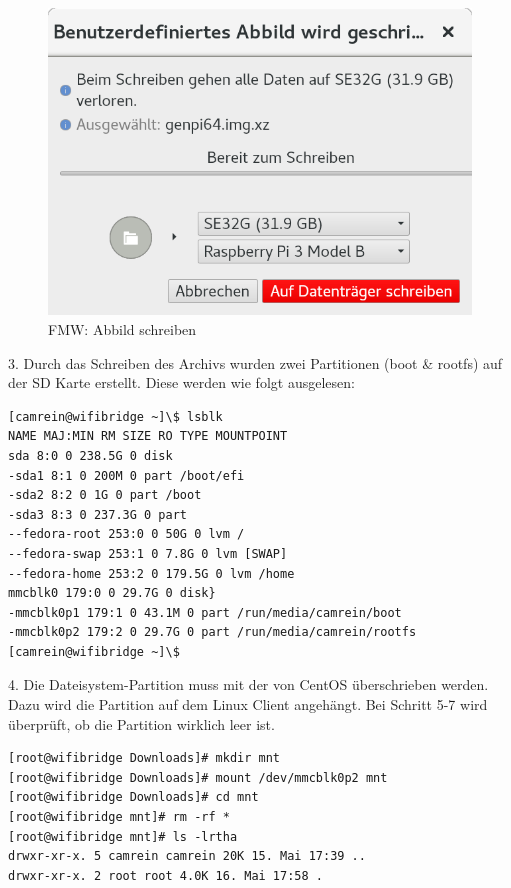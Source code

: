 \begin{figure}[H]
	\centering
	\includegraphics[scale=0.3]{Bilder/fmw3.png}
	\caption{FMW: Abbild schreiben}
\end{figure}
3. Durch das Schreiben des Archivs wurden zwei Partitionen (boot \& rootfs) auf der SD Karte erstellt. Diese werden wie folgt ausgelesen:
\begin{lstlisting}
[camrein@wifibridge ~]\$ lsblk
NAME MAJ:MIN RM SIZE RO TYPE MOUNTPOINT
sda 8:0 0 238.5G 0 disk 
-sda1 8:1 0 200M 0 part /boot/efi
-sda2 8:2 0 1G 0 part /boot
-sda3 8:3 0 237.3G 0 part 
--fedora-root 253:0 0 50G 0 lvm /
--fedora-swap 253:1 0 7.8G 0 lvm [SWAP]
--fedora-home 253:2 0 179.5G 0 lvm /home
mmcblk0 179:0 0 29.7G 0 disk}
-mmcblk0p1 179:1 0 43.1M 0 part /run/media/camrein/boot
-mmcblk0p2 179:2 0 29.7G 0 part /run/media/camrein/rootfs
[camrein@wifibridge ~]\$
\end{lstlisting}
4. Die Dateisystem-Partition muss mit der von CentOS überschrieben werden. Dazu wird die Partition auf dem Linux Client angehängt. Bei Schritt 5-7 wird überprüft, ob die Partition wirklich leer ist.
\begin{lstlisting}
[root@wifibridge Downloads]# mkdir mnt
[root@wifibridge Downloads]# mount /dev/mmcblk0p2 mnt
[root@wifibridge Downloads]# cd mnt
[root@wifibridge mnt]# rm -rf *
[root@wifibridge mnt]# ls -lrtha
drwxr-xr-x. 5 camrein camrein 20K 15. Mai 17:39 ..
drwxr-xr-x. 2 root root 4.0K 16. Mai 17:58 .
\end{lstlisting}

